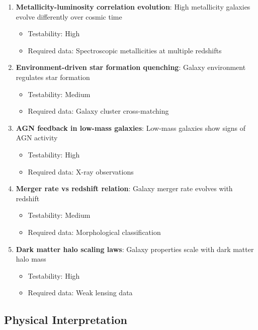 \documentclass[usenatbib]{rasti}
\begin{document}
\begin{enumerate}
\item \textbf{Metallicity-luminosity correlation evolution}: High metallicity galaxies evolve differently over cosmic time
   \begin{itemize}
   \item Testability: High
   \item Required data: Spectroscopic metallicities at multiple redshifts
   \end{itemize}

\item \textbf{Environment-driven star formation quenching}: Galaxy environment regulates star formation
   \begin{itemize}
   \item Testability: Medium
   \item Required data: Galaxy cluster cross-matching
   \end{itemize}

\item \textbf{AGN feedback in low-mass galaxies}: Low-mass galaxies show signs of AGN activity
   \begin{itemize}
   \item Testability: High
   \item Required data: X-ray observations
   \end{itemize}

\item \textbf{Merger rate vs redshift relation}: Galaxy merger rate evolves with redshift
   \begin{itemize}
   \item Testability: Medium
   \item Required data: Morphological classification
   \end{itemize}

\item \textbf{Dark matter halo scaling laws}: Galaxy properties scale with dark matter halo mass
   \begin{itemize}
   \item Testability: High
   \item Required data: Weak lensing data
   \end{itemize}
\end{enumerate}

\subsection{Physical Interpretation}
\end{document}

